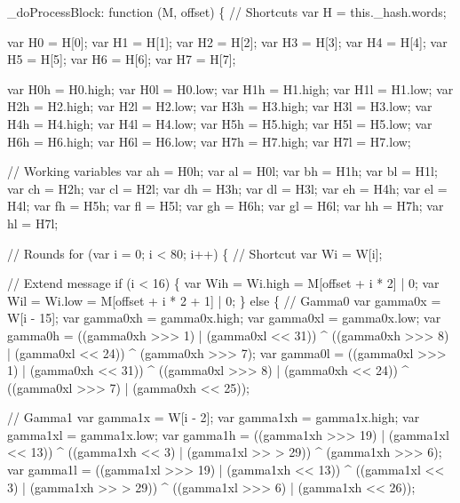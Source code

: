 \begin{DoxyCodeInclude}
        \_doProcessBlock: \textcolor{keyword}{function} (M, offset) \{
            \textcolor{comment}{// Shortcuts}
            var H = this.\_hash.words;

            var H0 = H[0];
            var H1 = H[1];
            var H2 = H[2];
            var H3 = H[3];
            var H4 = H[4];
            var H5 = H[5];
            var H6 = H[6];
            var H7 = H[7];

            var H0h = H0.high;
            var H0l = H0.low;
            var H1h = H1.high;
            var H1l = H1.low;
            var H2h = H2.high;
            var H2l = H2.low;
            var H3h = H3.high;
            var H3l = H3.low;
            var H4h = H4.high;
            var H4l = H4.low;
            var H5h = H5.high;
            var H5l = H5.low;
            var H6h = H6.high;
            var H6l = H6.low;
            var H7h = H7.high;
            var H7l = H7.low;

            \textcolor{comment}{// Working variables}
            var ah = H0h;
            var al = H0l;
            var bh = H1h;
            var bl = H1l;
            var ch = H2h;
            var cl = H2l;
            var dh = H3h;
            var dl = H3l;
            var eh = H4h;
            var el = H4l;
            var fh = H5h;
            var fl = H5l;
            var gh = H6h;
            var gl = H6l;
            var hh = H7h;
            var hl = H7l;

            \textcolor{comment}{// Rounds}
            \textcolor{keywordflow}{for} (var i = 0; i < 80; i++) \{
                \textcolor{comment}{// Shortcut}
                var Wi = W[i];

                \textcolor{comment}{// Extend message}
                \textcolor{keywordflow}{if} (i < 16) \{
                    var Wih = Wi.high = M[offset + i * 2]     | 0;
                    var Wil = Wi.low  = M[offset + i * 2 + 1] | 0;
                \} \textcolor{keywordflow}{else} \{
                    \textcolor{comment}{// Gamma0}
                    var gamma0x  = W[i - 15];
                    var gamma0xh = gamma0x.high;
                    var gamma0xl = gamma0x.low;
                    var gamma0h  = ((gamma0xh >>> 1) | (gamma0xl << 31)) ^ ((gamma0xh >>> 8) | (gamma0xl <<
       24)) ^ (gamma0xh >>> 7);
                    var gamma0l  = ((gamma0xl >>> 1) | (gamma0xh << 31)) ^ ((gamma0xl >>> 8) | (gamma0xh <<
       24)) ^ ((gamma0xl >>> 7) | (gamma0xh << 25));

                    \textcolor{comment}{// Gamma1}
                    var gamma1x  = W[i - 2];
                    var gamma1xh = gamma1x.high;
                    var gamma1xl = gamma1x.low;
                    var gamma1h  = ((gamma1xh >>> 19) | (gamma1xl << 13)) ^ ((gamma1xh << 3) | (gamma1xl >>
      > 29)) ^ (gamma1xh >>> 6);
                    var gamma1l  = ((gamma1xl >>> 19) | (gamma1xh << 13)) ^ ((gamma1xl << 3) | (gamma1xh >>
      > 29)) ^ ((gamma1xl >>> 6) | (gamma1xh << 26));


\end{DoxyCodeInclude}
